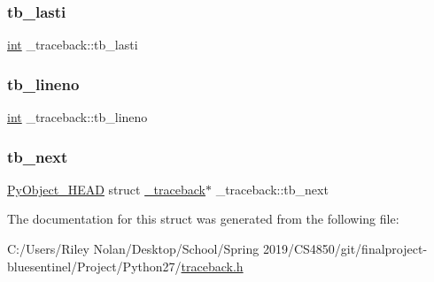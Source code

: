 \subsubsection{\texorpdfstring{tb\_lasti}{tb\_lasti}}
{\footnotesize\ttfamily \mbox{\hyperlink{warnings_8h_a74f207b5aa4ba51c3a2ad59b219a423b}{int}} \+\_\+traceback\+::tb\+\_\+lasti}

\mbox{\label{struct__traceback_a1368fff0890e04dce41ffa6aecb06628}} 
\subsubsection{\texorpdfstring{tb\_lineno}{tb\_lineno}}
{\footnotesize\ttfamily \mbox{\hyperlink{warnings_8h_a74f207b5aa4ba51c3a2ad59b219a423b}{int}} \+\_\+traceback\+::tb\+\_\+lineno}

\mbox{\label{struct__traceback_a1e0463e0fd57e8164db5b4a07144c020}} 
\subsubsection{\texorpdfstring{tb\_next}{tb\_next}}
{\footnotesize\ttfamily \mbox{\hyperlink{_python27_2object_8h_a0bf35c1f3ea13f925de94d8593db3b7e}{Py\+Object\+\_\+\+H\+E\+AD}} struct \mbox{\hyperlink{struct__traceback}{\+\_\+traceback}}$\ast$ \+\_\+traceback\+::tb\+\_\+next}



The documentation for this struct was generated from the following file\+:\begin{DoxyCompactItemize}
\item 
C\+:/\+Users/\+Riley Nolan/\+Desktop/\+School/\+Spring 2019/\+C\+S4850/git/finalproject-\/bluesentinel/\+Project/\+Python27/\mbox{\hyperlink{traceback_8h}{traceback.\+h}}\end{DoxyCompactItemize}
